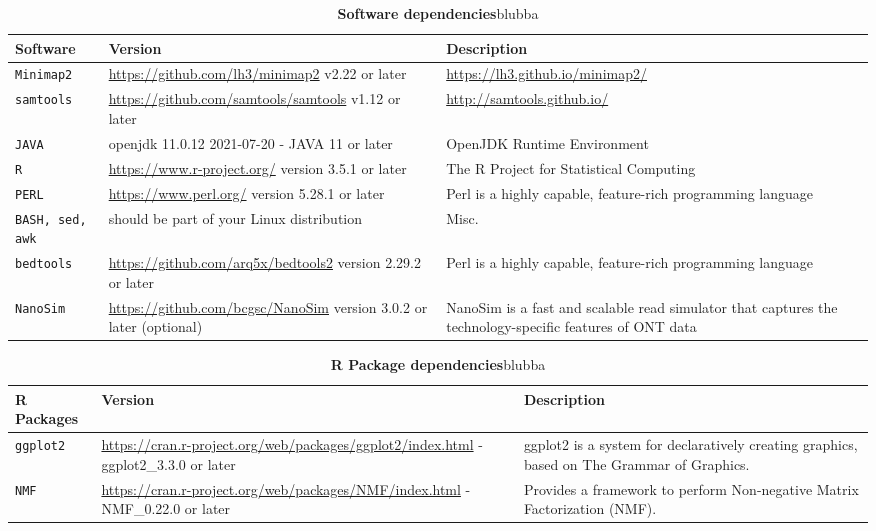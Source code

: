 \documentclass[times, 11pt, a4paper]{article}
\begin{document}
\begin{table}[]
\begin{tabular}{|p{1.5cm}|p{7cm}|p{6.5cm}|}
\hline 
            Software & Version & Description \\ 
            \hline \hline
            \texttt{Minimap2} & \url{https://github.com/lh3/minimap2} v2.22 or later & \url{https://lh3.github.io/minimap2/} \\ \hline
            \texttt{samtools} & \url{https://github.com/samtools/samtools} v1.12 or later & \url{http://samtools.github.io/} \\ \hline
	   \texttt{JAVA} & openjdk 11.0.12 2021-07-20 - JAVA 11 or later & OpenJDK Runtime Environment\\ \hline
	   \texttt{R} &  \url{https://www.r-project.org/} version 3.5.1 or later & The R Project for Statistical Computing \\ \hline
	   \texttt{PERL} &  \url{https://www.perl.org/} version 5.28.1 or later & Perl is a highly capable, feature-rich programming language \\ \hline
	   \texttt{BASH, sed, awk} &  should be part of your Linux distribution & Misc.\\ \hline
	   \texttt{bedtools} &  \url{https://github.com/arq5x/bedtools2} version 2.29.2 or later & Perl is a highly capable, feature-rich programming language \\ \hline	   
	   \texttt{NanoSim} &  \url{https://github.com/bcgsc/NanoSim} version 3.0.2 or later (optional) & NanoSim is a fast and scalable read simulator that captures the technology-specific features of ONT data\\ \hline	   
\end{tabular}
\caption{\textbf{Software dependencies}\label{tab:software} blubba}
\end{table}

\begin{table}[]
\begin{tabular}{|p{1.5cm}|p{7cm}|p{6.5cm}|}
\hline 
            R Packages & Version & Description \\ 
            \hline \hline
            \texttt{ggplot2} & \url{https://cran.r-project.org/web/packages/ggplot2/index.html} - ggplot2\_3.3.0 or later &  ggplot2 is a system for declaratively creating graphics, based on The Grammar of Graphics. \\ \hline
            \texttt{NMF} & \url{https://cran.r-project.org/web/packages/NMF/index.html} - NMF\_0.22.0 or later &  Provides a framework to perform Non-negative Matrix Factorization (NMF). \\ \hline
\end{tabular}
\caption{\textbf{R Package dependencies}\label{tab:software} blubba}
\end{table}
\end{document}
